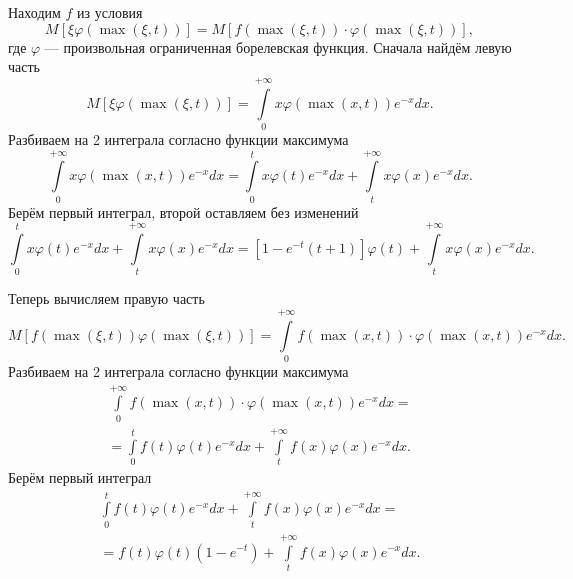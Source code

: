 \begin{enumerate}[label=\alph*)]
  Находим $f$ из условия
  $$M \left[ \xi \varphi \left( \max \left( \xi, t \right) \right) \right] =
    M \left[
      f \left( \max \left( \xi, t \right) \right) \cdot
      \varphi \left( \max \left( \xi, t \right) \right)
    \right],$$
  где $ \varphi $ --- произвольная ограниченная борелевская функция.
  Сначала найдём левую часть
  $$M \left[ \xi \varphi \left( \max \left( \xi, t \right) \right) \right] =
    \int \limits_0^{+ \infty } x \varphi \left( \max \left( x, t \right) \right) e^{-x} dx.$$
  Разбиваем на 2 интеграла согласно функции максимума
  $$ \int \limits_0^{+ \infty } x \varphi \left( \max \left( x, t \right) \right) e^{-x} dx =
    \int \limits_0^t x \varphi \left( t \right) e^{-x} dx +
    \int \limits_t^{+ \infty } x \varphi \left( x \right) e^{-x} dx.$$
  Берём первый интеграл, второй оставляем без изменений
  $$ \int \limits_0^t x \varphi \left( t \right) e^{-x} dx +
    \int \limits_t^{+ \infty } x \varphi \left( x \right) e^{-x} dx =
    \left[ 1 - e^{-t} \left( t + 1 \right) \right] \varphi \left( t \right) +
    \int \limits_t^{+ \infty } x \varphi \left( x \right) e^{-x} dx.$$

  Теперь вычисляем правую часть
  $$M \left[
      f \left( \max \left( \xi, t \right) \right) \varphi \left( \max \left( \xi, t \right) \right)
    \right] =
    \int \limits_0^{+ \infty }
      f \left( \max \left( x, t \right) \right) \cdot
      \varphi \left( \max \left( x, t \right) \right) e^{-x}
    dx.$$
  Разбиваем на 2 интеграла согласно функции максимума
  \begin{equation*}
    \begin{split}
      \int \limits_0^{+ \infty }
        f \left( \max \left( x, t \right) \right) \cdot
        \varphi \left( \max \left( x, t \right) \right) e^{-x}
      dx = \\
      = \int \limits_0^t f \left( t \right) \varphi \left( t \right) e^{-x} dx +
      \int \limits_t^{+ \infty } f \left( x \right) \varphi \left( x \right) e^{-x} dx.
    \end{split}
  \end{equation*}
  Берём первый интеграл
  \begin{equation*}
    \begin{split}
      \int \limits_0^t f \left( t \right) \varphi \left( t \right) e^{-x} dx +
      \int \limits_t^{+ \infty } f \left( x \right) \varphi \left( x \right) e^{-x} dx = \\
      = f \left( t \right) \varphi \left( t \right) \left( 1 - e^{-t} \right) +
      \int \limits_t^{+ \infty } f \left( x \right) \varphi \left( x \right) e^{-x} dx.
    \end{split}
  \end{equation*}


\end{enumerate}
